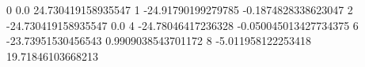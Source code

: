 0 0.0 24.730419158935547
1 -24.91790199279785 -0.1874828338623047
2 -24.730419158935547 0.0
4 -24.78046417236328 -0.050045013427734375
6 -23.73951530456543 0.9909038543701172
8 -5.011958122253418 19.71846103668213

